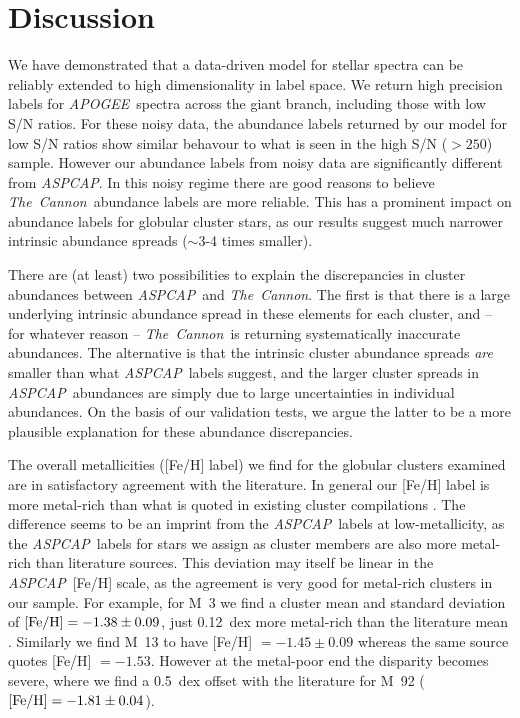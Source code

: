 \documentclass[12pt,preprint]{aastex}
\newcommand{\project}[1]{\textsl{#1}}
\newcommand{\TheCannon}{\project{The~Cannon}}
\newcommand{\acronym}[1]{{\small{#1}}}
\newcommand{\apogee}{\project{\acronym{APOGEE}}}
\newcommand{\aspcap}{\project{\acronym{ASPCAP}}}
\begin{document}
\section{Discussion}
\label{sec:discussion}


We have demonstrated that a data-driven model for stellar spectra can be
reliably extended to high dimensionality in label space. We return high
precision labels for \apogee\ spectra across the giant branch, including
those with low S/N ratios. For these noisy data, the abundance labels returned
by our model for low S/N ratios show similar behavour to what is seen in the high
S/N ($>250$) sample.  However our abundance labels from noisy data are
significantly different from \aspcap. In this noisy regime
there are good reasons to believe \TheCannon\ abundance labels are more
reliable.  This has a prominent impact on abundance labels for globular
cluster stars, as our results suggest much narrower intrinsic abundance
spreads ($\sim$3-4 times smaller).


There are (at least) two possibilities to explain the discrepancies in
cluster abundances between \aspcap\ and \TheCannon.  The first is that
there is a large underlying intrinsic abundance spread in these elements
for each cluster, and -- for whatever reason -- \TheCannon\ is returning
systematically inaccurate abundances.  The alternative is that the
intrinsic cluster abundance spreads \emph{are} smaller than what \aspcap\
labels suggest, and the larger cluster spreads in \aspcap\ abundances are
simply due to large uncertainties in individual abundances.  On the basis
of our validation tests, we argue the latter to be a more plausible
explanation for these abundance discrepancies.


The overall metallicities ([Fe/H] label) we find for the globular
clusters examined are in satisfactory agreement with the literature.  In
general our [Fe/H] label is more metal-rich than what is quoted in existing cluster
compilations \citep{Harris_1996}.  The difference seems to be an imprint from
the \aspcap\ labels at low-metallicity, as the \aspcap\ labels for 
stars we assign as cluster members are also more metal-rich than
literature sources. This deviation may itself be linear in the 
\aspcap\ [Fe/H] scale, as the agreement is very good for 
metal-rich clusters in our sample.  For example, for M~3 we find a cluster mean and standard
deviation of $[{\rm Fe/H}] = -1.38 \pm 0.09$, just 0.12~dex more metal-rich
than the literature mean \citep{Harris_1996}.  Similarly we find M~13 to have
[Fe/H] $= -1.45 \pm 0.09$ whereas the same source quotes [Fe/H] $= -1.53$.
However at the metal-poor end the disparity becomes severe, where we find
a 0.5~dex offset with the literature for M~92 ($[{\rm Fe/H}] = -1.81 \pm 0.04$).
\end{document}
